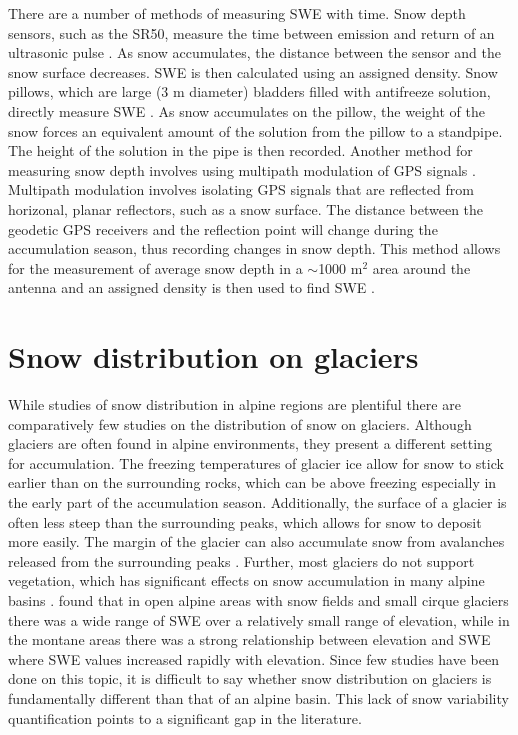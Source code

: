 \documentclass[12pt]{article}
\begin{document}
There are a number of methods of measuring SWE with time. Snow depth sensors, such as the SR50, measure the time between emission and return of an ultrasonic pulse \citep{Ryan2008}. As snow accumulates, the distance between the sensor and the snow surface decreases. SWE is then calculated using an assigned density. Snow pillows, which are large (3 m diameter) bladders filled with antifreeze solution, directly measure SWE \citep{Archer1995}. As snow accumulates on the pillow, the weight of the snow forces an equivalent amount of the solution from the pillow to a standpipe. The height of the solution in the pipe is then recorded. Another method for measuring snow depth involves using multipath modulation of GPS signals \citep{Larson2009,McCreight2014}. Multipath modulation involves isolating GPS signals that are reflected from horizonal, planar reflectors, such as a snow surface. The distance between the geodetic GPS receivers and the reflection point will change during the accumulation season, thus recording changes in snow depth. This method allows for the measurement of average snow depth in a $\sim$1000 m$^2$ area around the antenna and an assigned density is then used to find SWE \citep{McCreight2014}.

\section{Snow distribution on glaciers}
While studies of snow distribution in alpine regions are plentiful \citep[and sources within]{Clark2011} there are comparatively few studies on the distribution of snow on glaciers. Although glaciers are often found in alpine environments, they present a different setting for accumulation. The freezing temperatures of glacier ice allow for snow to stick earlier than on the surrounding rocks, which can be above freezing especially in the early part of the accumulation season. Additionally, the surface of a glacier is often less steep than the surrounding peaks, which allows for snow to deposit more easily. The margin of the glacier can also accumulate snow from avalanches released from the surrounding peaks \citep{Bloschl1991, Mott2008}. Further, most glaciers do not support vegetation, which has significant effects on snow accumulation in many alpine basins \citep{Pomeroy1999}. \cite{Alford1985} found that in open alpine areas with snow fields and small cirque glaciers there was a wide range of SWE over a relatively small range of elevation, while in the montane areas there was a strong relationship between elevation and SWE where SWE values increased rapidly with elevation. Since few studies have been done on this topic, it is difficult to say whether snow distribution on glaciers is fundamentally different than that of an alpine basin. This lack of snow variability quantification points to a significant gap in the literature.
\end{document}
